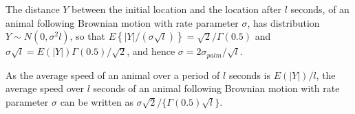 \documentclass[useAMS, usenatbib, referee]{biom}\usepackage[]{graphicx}\usepackage[]{color}
\begin{document}
The distance $Y$ between the initial location and the location after $l$ seconds, of an animal following Brownian motion with rate parameter $\sigma$, has distribution $Y\sim N(0,\sigma^2l)$, so that $E\left\{|Y|/(\sigma\sqrt{l})\right\}=\sqrt{2}/\Gamma(0.5)$ and $\sigma\sqrt{l}=E(|Y|)\Gamma(0.5)/\sqrt{2}$, and hence $\sigma=2\sigma_{palm}/\sqrt{l}$.

As the average speed of an animal over a period of $l$ seconds is $E(|Y|)/l$, the average speed over $l$ seconds of an animal following Brownian motion with rate parameter $\sigma$ can be written as $\sigma\sqrt{2}/\{\Gamma(0.5)\sqrt{l}\}$.





\end{document}
